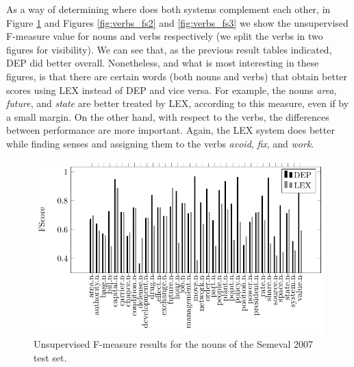 As a way of determining where does both systems complement each other, in Figure \ref{fig:nouns_fs} and Figures  \ref{fig:verbs_fs2} and \ref{fig:verbs_fs3} we show the unsupervised F-measure value for nouns and verbs respectively (we split the verbs in two figures for visibility). We can see that, as the previous result tables indicated, DEP did better overall. Nonetheless, and what is most interesting in these figures, is that there are certain words (both nouns and verbs) that obtain better scores using LEX instead of DEP and vice versa. For example, the nouns \textit{area}, \textit{future}, and \textit{state} are better treated by LEX, according to this measure, even if by a small margin. On the other hand, with respect to the verbs, the differences between performance are more important. Again, the LEX system does better while finding senses and assigning them to the verbs \textit{avoid}, \textit{fix}, and \textit{work}. %

 




 \begin{figure}[!htb]
\centering
\includegraphics[width=1\linewidth]{images/Chapitre5/tex_img_files/nouns_fs.pdf}
\caption{Unsupervised F-measure results for the nouns of the Semeval 2007 test set.}
\label{fig:nouns_fs}
\end{figure}

